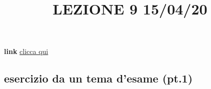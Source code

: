 \title{LEZIONE 9 15/04/20}
\textbf{link} \href{https://web.microsoftstream.com/video/50d86a59-0bba-4abf-80d2-97c0fc1f39e1?list=user&userId=cfe0965d-9a7c-40e2-be6e-f078296a1914}{clicca qui}
\subsection{esercizio da un tema d'esame (pt.1)}